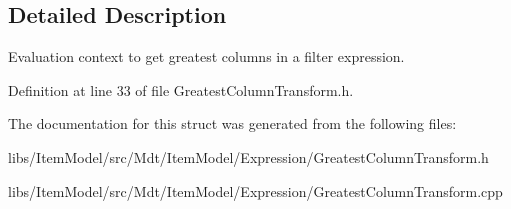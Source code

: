 \subsection{Detailed Description}
Evaluation context to get greatest columns in a filter expression. 

Definition at line 33 of file Greatest\+Column\+Transform.\+h.



The documentation for this struct was generated from the following files\+:\begin{DoxyCompactItemize}
\item 
libs/\+Item\+Model/src/\+Mdt/\+Item\+Model/\+Expression/Greatest\+Column\+Transform.\+h\item 
libs/\+Item\+Model/src/\+Mdt/\+Item\+Model/\+Expression/Greatest\+Column\+Transform.\+cpp\end{DoxyCompactItemize}
